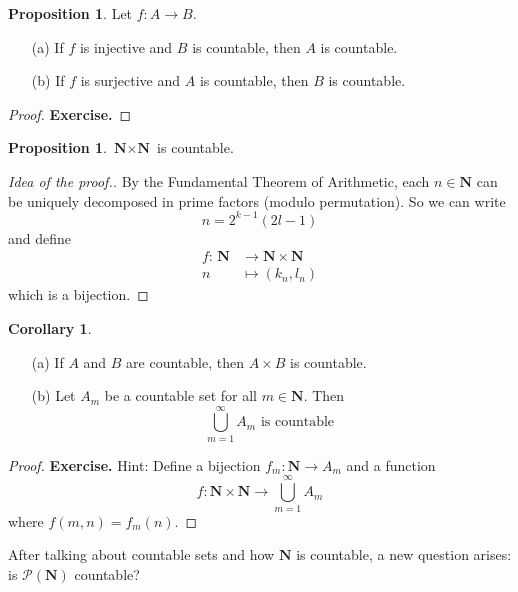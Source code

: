 \documentclass[tikz,12pt,a4paper]{article}
\theoremstyle{definition}
\newtheorem{corollary}[theorem]{Corollary}
\newtheorem{proposition}[theorem]{Proposition}
\begin{document}
\begin{proposition}
	Let $f : A \longrightarrow B$.
	\begin{itemize}
		\item[(a)] If $f$ is injective and $B$ is countable, then $A$ is countable.
		\item[(b)] If $f$ is surjective and $A$ is countable, then $B$ is countable.
	\end{itemize}
\end{proposition}

\begin{proof}
	\textbf{Exercise.}
\end{proof}

\begin{proposition}
	$\textbf{N} \times \textbf{N}$ is countable.
\end{proposition}

\begin{proof}[Idea of the proof.]
	By the Fundamental Theorem of Arithmetic, each $n \in \textbf{N}$ can be uniquely decomposed in prime factors (modulo permutation). So we can write
	\[ n = 2^{k-1} (2l-1) \]
	and define
	\begin{equation*}
		\begin{aligned}
			f : \, \textbf{N} & \longrightarrow \textbf{N} \times \textbf{N} \\
			n & \longmapsto (k_n, l_n)
		\end{aligned}
	\end{equation*}
	which is a bijection.
\end{proof}

\begin{corollary} \hfill
	\begin{itemize}
		\item[(a)] If $A$ and $B$ are countable, then $A \times B$ is countable.
		\item[(b)] Let $A_m$ be a countable set for all $m \in \textbf{N}$. Then \[ \bigcup_{m=1}^\infty A_m \text{ is countable } \]
	\end{itemize}
\end{corollary}

\begin{proof}
	\textbf{Exercise.} Hint: Define a bijection $f_m : \textbf{N} \longrightarrow A_m$ and a function \[f : \textbf{N} \times \textbf{N} \longrightarrow \bigcup_{m=1}^\infty A_m\] where $f(m,n) = f_m(n)$.
\end{proof}

After talking about countable sets and how $\textbf{N}$ is countable, a new question arises: is $\mathcal{P}(\textbf{N})$ countable?
\end{document}
